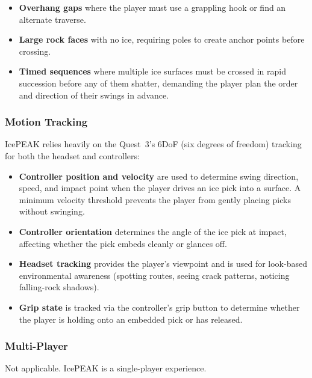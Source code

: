 \documentclass[12pt]{article}
\begin{document}
\begin{itemize}[leftmargin=2em]
    \item \textbf{Overhang gaps} where the player must use a grappling hook or find an alternate traverse.
    \item \textbf{Large rock faces} with no ice, requiring poles to create anchor points before crossing.
    \item \textbf{Timed sequences} where multiple ice surfaces must be crossed in rapid succession before any of them shatter, demanding the player plan the order and direction of their swings in advance.
\end{itemize}


\subsubsection{Motion Tracking}

IcePEAK relies heavily on the Quest~3's 6DoF (six degrees of freedom) tracking for both the headset and controllers:

\begin{itemize}[leftmargin=2em]
    \item \textbf{Controller position and velocity} are used to determine swing direction, speed, and impact point when the player drives an ice pick into a surface. A minimum velocity threshold prevents the player from gently placing picks without swinging.
    \item \textbf{Controller orientation} determines the angle of the ice pick at impact, affecting whether the pick embeds cleanly or glances off.
    \item \textbf{Headset tracking} provides the player's viewpoint and is used for look-based environmental awareness (spotting routes, seeing crack patterns, noticing falling-rock shadows).
    \item \textbf{Grip state} is tracked via the controller's grip button to determine whether the player is holding onto an embedded pick or has released.
\end{itemize}

\subsubsection{Multi-Player}

Not applicable. IcePEAK is a single-player experience.
\end{document}
